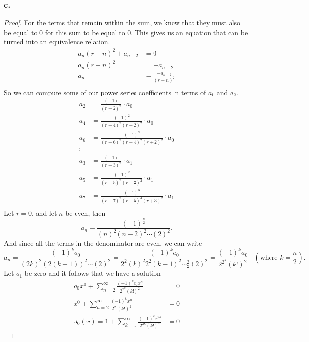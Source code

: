 \documentclass{article}
\theoremstyle{definition}
\begin{document}
        \subsubsection*{c.}
            \begin{proof}
            For the terms that remain within the sum, we know that they must also be equal to 0 for this sum to be equal to 0.                
            This gives us an equation that can be turned into an equivalence relation.
            \begin{align*}
                a_n(r+n)^2 + a_{n-2} &= 0 \\
                a_n(r+n)^2 &= -a_{n-2} \\
                a_n &= \frac{-a_{n-2}}{(r+n)^2} \\
            \end{align*}
            So we can compute some of our power series coefficients in terms of $a_1$ and $a_2$.
            \begin{align*}
                a_2 &= \frac{(-1)}{(r+2)^2} \cdot a_0 \\
                a_4 &= \frac{(-1)^2}{(r+4)^2(r+2)^2} \cdot a_0 \\
                a_6 &= \frac{(-1)^3}{(r+6)^2(r+4)^2(r+2)^2} \cdot a_0 \\
                \vdots & \\
                a_3 &= \frac{(-1)}{(r+3)^2} \cdot a_1 \\
                a_5 &= \frac{(-1)^2}{(r+5)^2(r+3)^2} \cdot a_1 \\
                a_7 &= \frac{(-1)^3}{(r+7)^2(r+5)^2(r+3)^2} \cdot a_1 \\
            \end{align*}
            Let $r = 0$, and let $n$ be even, then 
            \[
            a_n = \frac{(-1)^{\frac{n}{2}}}{(n)^2(n-2)^2\cdots(2)^2}
            .\] 
            And since all the terms in the denominator are even, we can write
            \[
            a_n = \frac{(-1)^k a_0}{(2k)^2(2(k-1))^2\cdots(2)^2} 
            = \frac{(-1)^k a_0}{2^2(k)^2 2^2(k-1)^2\cdots_2^2 (2)^2} 
            = \frac{(-1)^k a_0}{2^{2^k}(k!)^2} \ \ \ \ \left(\text{where } k = \frac{n}{2}\right)
            .\] 
            Let $a_1$ be zero and it follows that we have a solution 
            \begin{align*}
            a_0 x^0 + \sum_{n=2}^{\infty} \frac{(-1)^k a_0 x^n}{2^{2^k}(k!)^2} &= 0 \\
            x^0 + \sum_{n=2}^{\infty} \frac{(-1)^k x^n}{2^{2^k}(k!)^2} &= 0 \\
            J_0(x) = 1 + \sum_{k=1}^{\infty} \frac{(-1)^k x^{2k}}{2^{2k}(k!)^2} &= 0
            \end{align*}
            \end{proof}
\end{document}
